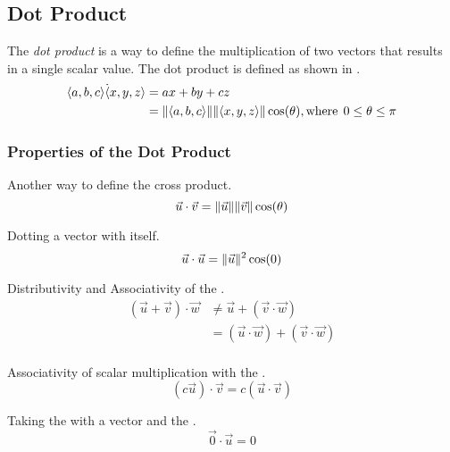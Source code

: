 \subsection{Dot Product}\label{subsec:Vector_Dot_Product}
\begin{definition}\label{def:Dot_Product}
  The \emph{dot product} is a way to define the multiplication of two vectors that results in a single scalar value.
  The dot product is defined as shown in .
  \begin{equation}\label{eq:Dot_Product}
    \begin{aligned}
      \langle a, b, c \rangle \dot \langle x, y, z \rangle &= ax + by + cz \\
      &= \lVert \langle a, b, c \rangle \rVert \lVert \langle x, y, z \rangle \rVert \cos(\theta), \text{where} \:\: 0 \leq \theta \leq \pi \\
    \end{aligned}
  \end{equation}
\end{definition}

\subsubsection{Properties of the Dot Product}\label{subsubsec:Dot_Product_Properties}
\begin{propertylist}
\item Another way to define the cross product.\label{prop:Dot_Product_Magnitude_Angle}
  \begin{equation*}
    \vec{u} \cdot \vec{v} = \lVert \vec{u} \rVert \lVert \vec{v} \rVert \cos(\theta)
  \end{equation*}
\item Dotting a vector with itself.
  \begin{equation*}
    \vec{u} \cdot \vec{u} = \lVert \vec{u} \rVert^{2} \cos(0)
  \end{equation*}
\item Distributivity and Associativity of the .
  \begin{equation*}
    \begin{aligned}
      (\vec{u} + \vec{v}) \cdot \vec{w} &\neq \vec{u} + (\vec{v} \cdot \vec{w}) \\
      &= (\vec{u} \cdot \vec{w}) + (\vec{v} \cdot \vec{w}) \\
    \end{aligned}
  \end{equation*}
\item Associativity of scalar multiplication with the .
  \begin{equation*}
    (c \vec{u}) \cdot \vec{v} = c(\vec{u} \cdot \vec{v})
  \end{equation*}
\item Taking the  with a vector and the .
  \begin{equation*}
    \vec{0} \cdot \vec{u} = 0
  \end{equation*}
\end{propertylist}

